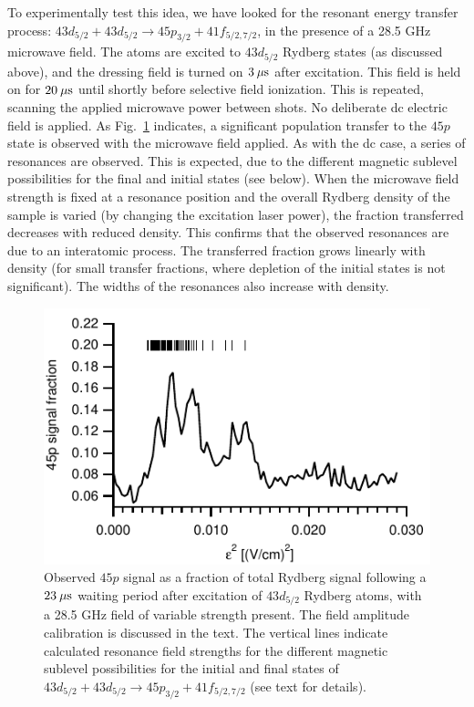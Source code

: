 \documentclass[letterpaper,twocolumn,showpacs,preprintnumbers,amsmath,amssymb,prl,nolongbibliography]{revtex4-2}
\begin{document}
To experimentally test this idea, we have looked for the resonant
energy transfer
process:
$43d_{5/2} + 43d_{5/2} \rightarrow 45p_{3/2} + 41f_{5/2,7/2}$,
in the presence of a 28.5 GHz microwave field.
The atoms are excited to
$43d_{5/2}$ Rydberg states
(as discussed above), and the
dressing field is turned on $3 \: {\rm \mu s}$ after excitation.
This field is held on for $20 \: {\rm \mu s}$
until shortly before selective
field ionization.   This is repeated, scanning the applied
microwave power between shots.  No deliberate dc
electric field is applied.
As Fig.~\ref{fg:acret}
indicates, a significant population transfer to the $45p$ state is
observed with the microwave field applied.
As with the dc case, a series of resonances are observed.
This is expected, due to the different magnetic sublevel possibilities
for the final and initial states (see below).
When the microwave
field strength is fixed at a resonance position and the overall
Rydberg density of the sample is varied (by changing the excitation
laser power), the fraction transferred decreases with reduced density.
This confirms that the observed resonances are due to an
interatomic process.
The transferred fraction grows linearly with density
(for small transfer fractions, where depletion of the initial
states is not significant).
The widths of the resonances also increase with density.

\begin{figure}
\includegraphics{fig4.pdf}
\caption{
\label{fg:acret}
Observed $45p$ signal as a fraction of total Rydberg
signal following a $23 \: {\rm \mu s}$ waiting period after
excitation of $43d_{5/2}$ Rydberg atoms,
with a 28.5 GHz field of variable strength present.
The field amplitude calibration is discussed in the text.
The vertical lines indicate calculated resonance field strengths
for the different magnetic sublevel possibilities for
the initial and final states of
$43d_{5/2} + 43d_{5/2} \rightarrow 45p_{3/2} + 41f_{5/2,7/2}$
(see text for details).
}
\end{figure}
\end{document}
